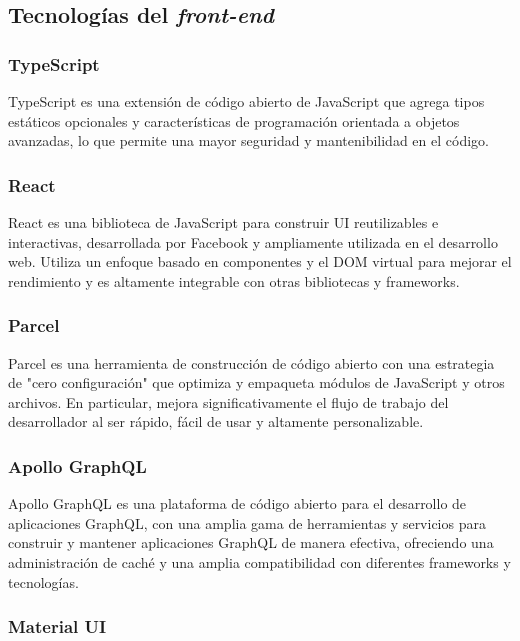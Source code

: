 \newpage
\subsection{Tecnologías del \textit{front-end}}

\subsubsection{TypeScript}

TypeScript \citep{typescript} es una extensión de código abierto de JavaScript que agrega tipos estáticos opcionales y características de programación orientada a objetos avanzadas, lo que permite una mayor seguridad y mantenibilidad en el código. 


\subsubsection{React}

React \citep{react} es una biblioteca de JavaScript para construir UI reutilizables e interactivas, desarrollada por Facebook y ampliamente utilizada en el desarrollo web. Utiliza un enfoque basado en componentes y el DOM virtual para mejorar el rendimiento y es altamente integrable con otras bibliotecas y frameworks.


\subsubsection{Parcel}

Parcel \citep{parcel} es una herramienta de construcción de código abierto con una estrategia de "cero configuración" que optimiza y empaqueta módulos de JavaScript y otros archivos. En particular, mejora significativamente el flujo de trabajo del desarrollador al ser rápido, fácil de usar y altamente personalizable.


\subsubsection{Apollo GraphQL}

Apollo GraphQL \citep{apollo-graphql} es una plataforma de código abierto para el desarrollo de aplicaciones GraphQL, con una amplia gama de herramientas y servicios para construir y mantener aplicaciones GraphQL de manera efectiva, ofreciendo una administración de caché y una amplia compatibilidad con diferentes frameworks y tecnologías.


\subsubsection{Material UI}

